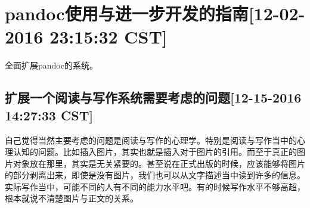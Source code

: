 \chapter{pandoc使用与进一步开发的指南[12-02-2016 23:15:32 CST]}

全面扩展pandoc的系统。


\section{扩展一个阅读与写作系统需要考虑的问题[12-15-2016 14:27:33 CST]}

自己觉得当然主要考虑的问题是阅读与写作的心理学。特别是阅读与写作当中的心理认知的问题。比如插入图片，其实也就是插入对于图片的引用。而至于真正的图片对象放在那里，其实是无关紧要的。甚至说在正式出版的时候，应该能够将图片的部分剥离出来，即使是没有图片，我们也可以从文字描述当中读到许多的信息。实际写作当中，可能不同的人有不同的能力水平吧。有的时候写作水平不够高超，根本就说不清楚图片与正文的关系。
